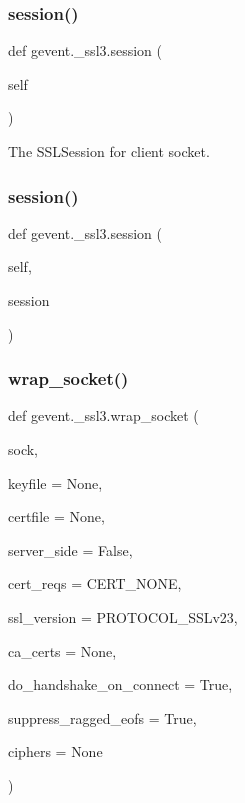 \subsubsection{\texorpdfstring{session()}{session()}\hspace{0.1cm}{\footnotesize\ttfamily [1/2]}}
{\footnotesize\ttfamily def gevent.\+\_\+ssl3.\+session (\begin{DoxyParamCaption}\item[{}]{self }\end{DoxyParamCaption})}

\begin{DoxyVerb}The SSLSession for client socket.\end{DoxyVerb}
 \mbox{\label{namespacegevent_1_1__ssl3_a00647338146e56cb2cad9838a1c60826}} 
\subsubsection{\texorpdfstring{session()}{session()}\hspace{0.1cm}{\footnotesize\ttfamily [2/2]}}
{\footnotesize\ttfamily def gevent.\+\_\+ssl3.\+session (\begin{DoxyParamCaption}\item[{}]{self,  }\item[{}]{session }\end{DoxyParamCaption})}

\mbox{\label{namespacegevent_1_1__ssl3_a49b27528d72dbbd67fb256e20a78750c}} 
\subsubsection{\texorpdfstring{wrap\+\_\+socket()}{wrap\_socket()}}
{\footnotesize\ttfamily def gevent.\+\_\+ssl3.\+wrap\+\_\+socket (\begin{DoxyParamCaption}\item[{}]{sock,  }\item[{}]{keyfile = {\ttfamily None},  }\item[{}]{certfile = {\ttfamily None},  }\item[{}]{server\+\_\+side = {\ttfamily False},  }\item[{}]{cert\+\_\+reqs = {\ttfamily CERT\+\_\+NONE},  }\item[{}]{ssl\+\_\+version = {\ttfamily PROTOCOL\+\_\+SSLv23},  }\item[{}]{ca\+\_\+certs = {\ttfamily None},  }\item[{}]{do\+\_\+handshake\+\_\+on\+\_\+connect = {\ttfamily True},  }\item[{}]{suppress\+\_\+ragged\+\_\+eofs = {\ttfamily True},  }\item[{}]{ciphers = {\ttfamily None} }\end{DoxyParamCaption})}



